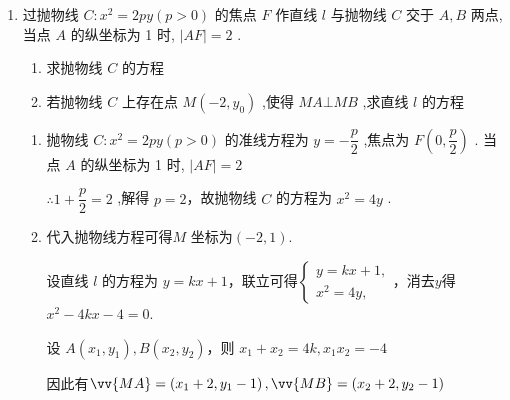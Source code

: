 \begin{enumerate}
\begin{enumerate}
\begin{jieda}
            
            设过点 $A$ 作抛物线的一条切线为 $x = {my} - 1,m > 0$，由 $\left\{  \begin{array}{l} x = {my} - 1, \\  {y}^{2} = {4x}, \end{array}\right.$ 得 ${y}^{2} - {4my} + 4 = 0$
            
            $\Delta  = {\left( -4m\right) }^{2} - 4 \times  4 = 0$，解得 $m = 1$，故${y}^{2} - {4y} + 4 = 0$，解得 $y = 2$，即 ${y}_{B} = 2$，所以$\bigtriangleup {OAB}$ 的面积为 $\dfrac{1}{2} \times  1 \times  2 = 1$.
        \end{jieda}
        \item 过抛物线 $C : {x}^{2} = {2py}\left( {p > 0}\right)$ 的焦点 $F$ 作直线 $l$ 与抛物线 $C$ 交于 $A,B$ 两点,当点 $A$ 的纵坐标为 1 时, $\left| {AF}\right|  = 2$ .
        \begin{enumerate}
            \item 求抛物线 $C$ 的方程
            \item 若抛物线 $C$ 上存在点 $M\left( {-2,{y}_{0}}\right)$ ,使得 ${MA} \bot  {MB}$ ,求直线 $l$ 的方程
        \end{enumerate}
        \begin{jieda}
            \begin{enumerate}
                \item 抛物线 $C : {x}^{2} = {2py}\left( {p > 0}\right)$ 的准线方程为 $y =  - \dfrac{p}{2}$ ,焦点为 $F\left( {0,\dfrac{p}{2}}\right)$ . 当点 $A$ 的纵坐标为 1 时, $\left| {AF}\right|  = 2$
                
                $\therefore 1 + \dfrac{p}{2} = 2$ ,解得 $p = 2$，故抛物线 $C$ 的方程为 ${x}^{2} = {4y}$ .
                \item 代入抛物线方程可得$M$ 坐标为$(-2,1)$.
                
                设直线 $l$ 的方程为 $y = {kx} + 1$，联立可得$\left\{  \begin{array}{l} y = {kx} + 1, \\  {x}^{2} = {4y}, \end{array}\right.$，消去$y$得 ${x}^{2} - {4kx} - 4 = 0$.

                设 $A\left( {{x}_{1},{y}_{1}}\right) ,B\left( {{x}_{2},{y}_{2}}\right)$，则 ${x}_{1} + {x}_{2} = {4k},{x}_{1}{x}_{2} =  - 4$
                
                因此有$\vv{MA} = \left( {{x}_{1} + 2,{y}_{1} - 1}\right),\vv{MB} = \left( {{x}_{2} + 2,{y}_{2} - 1}\right)$
                

\end{enumerate}
\end{jieda}
\end{enumerate}
\end{enumerate}
